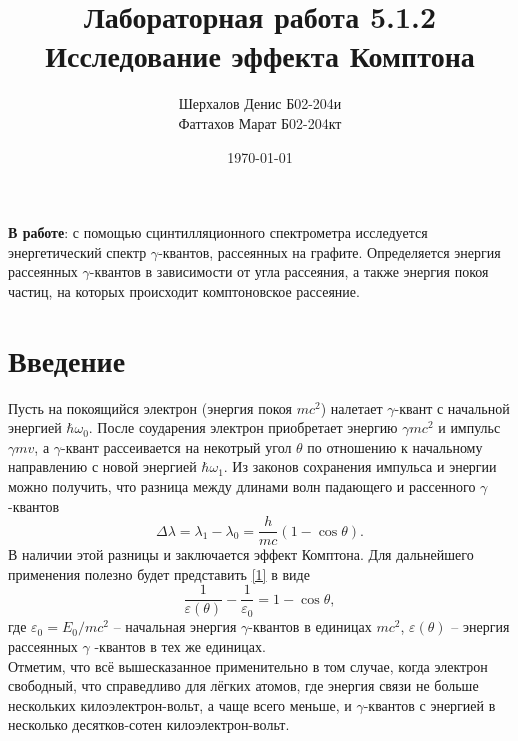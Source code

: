 \documentclass[a4paper,12pt]{article}
\author{Шерхалов Денис Б02-204и \\
		Фаттахов Марат Б02-204кт}
\title{Лабораторная работа 5.1.2 \\
	\textbf{Исследование эффекта Комптона}}
\date{\today}
\theoremstyle{definition}
\begin{document}
	
{\Large \maketitle}

\textbf{В работе}: с помощью сцинтилляционного спектрометра исследуется энергетический спектр $\gamma$-квантов, рассеянных на графите. Определяется энергия рассеянных $\gamma$-квантов в зависимости от угла рассеяния, а также энергия покоя частиц, на которых происходит комптоновское рассеяние.

\section{Введение}

Пусть на покоящийся электрон (энергия покоя $mc^2$) налетает $\gamma$-квант с начальной энергией $\hbar \omega_0$. После соударения электрон приобретает энергию $\gamma mc^2$ и импульс $\gamma mv$, а $\gamma$-квант рассеивается на некотрый угол $\theta$ по отношению к начальному направлению с новой энергией $\hbar \omega_1$. Из законов сохранения импульса и энергии можно получить, что разница между длинами волн падающего и рассенного $\gamma$-квантов
\begin{equation}\label{1}
\Delta \lambda = \lambda_1 - \lambda_0 = \dfrac{h}{mc} (1-\cos \theta).
\end{equation}
В наличии этой разницы и заключается эффект Комптона. Для дальнейшего применения полезно будет представить \eqref{1} в виде
\[\tag{1a}\label{1a}
\dfrac{1}{\varepsilon(\theta)} - \dfrac{1}{\varepsilon_0} = 1 - \cos \theta,
\]
где $\varepsilon_0 = E_0/mc^2$ -- начальная энергия $\gamma$-квантов в единицах $mc^2$, $\varepsilon(\theta)$ -- энергия рассеянных $\gamma$ -квантов в тех же единицах.\\
Отметим, что всё вышесказанное применительно в том случае, когда электрон свободный, что справедливо для лёгких атомов, где энергия связи не больше нескольких килоэлектрон-вольт, а чаще всего меньше, и $\gamma$-квантов с энергией в несколько десятков-сотен килоэлектрон-вольт.
\end{document}
